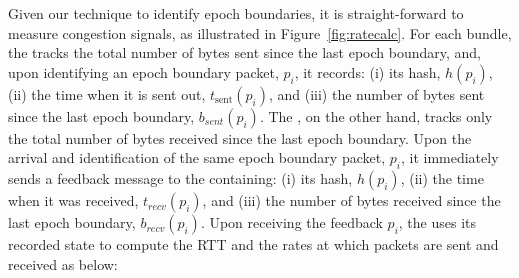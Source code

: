 Given our technique to identify epoch boundaries, it is straight-forward to measure congestion signals, as illustrated in Figure~\ref{fig:ratecalc}.
For each bundle, the \inbox tracks the total number of bytes sent since the last epoch boundary, and, upon identifying an epoch boundary packet, $p_i$, it records: (i) its hash, $h(p_i)$, (ii) the time when it is sent out, $t_{\text{sent}}(p_i)$, and (iii) the number of bytes sent since the last epoch boundary, $b_{sent}(p_i)$. 
The \outbox, on the other hand, tracks only the total number of bytes received since the last epoch boundary. Upon the arrival and identification of the same epoch boundary packet, $p_i$, it immediately sends a feedback message to the \inbox containing: (i) its hash, $h(p_i)$, (ii) the time when it was received, $t_{recv}(p_i)$, and (iii) the number of bytes received since the last epoch boundary, $b_{recv}(p_i)$. 
Upon receiving the feedback $p_i$, the \inbox uses its recorded state to compute the RTT and the rates at which packets are sent and received as below:

